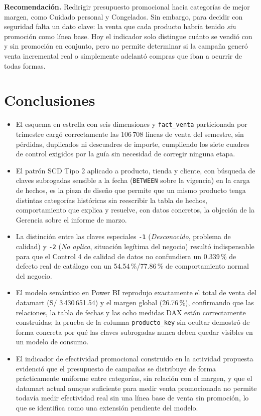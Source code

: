 \documentclass[11pt,a4paper]{article}
\begin{document}
\textbf{Recomendación.} Redirigir presupuesto promocional hacia categorías de mejor margen, como Cuidado personal y Congelados. Sin embargo, para decidir con seguridad falta un dato clave: la venta que cada producto habría tenido \emph{sin} promoción como línea base. Hoy el indicador solo distingue cuánto se vendió con y sin promoción en conjunto, pero no permite determinar si la campaña generó venta incremental real o simplemente adelantó compras que iban a ocurrir de todas formas.

\section{Conclusiones}

\begin{itemize}
  \item El esquema en estrella con seis dimensiones y \texttt{fact\_venta} particionada por trimestre cargó correctamente las 106\,708 líneas de venta del semestre, sin pérdidas, duplicados ni descuadres de importe, cumpliendo los siete cuadres de control exigidos por la guía sin necesidad de corregir ninguna etapa.
  \item El patrón SCD Tipo 2 aplicado a producto, tienda y cliente, con búsqueda de claves subrogadas sensible a la fecha (\texttt{BETWEEN} sobre la vigencia) en la carga de hechos, es la pieza de diseño que permite que un mismo producto tenga distintas categorías históricas sin reescribir la tabla de hechos, comportamiento que explica y resuelve, con datos concretos, la objeción de la Gerencia sobre el informe de marzo.
  \item La distinción entre las claves especiales \texttt{-1} (\emph{Desconocido}, problema de calidad) y \texttt{-2} (\emph{No aplica}, situación legítima del negocio) resultó indispensable para que el Control 4 de calidad de datos no confundiera un 0.339\,\% de defecto real de catálogo con un 54.54\,\%/77.86\,\% de comportamiento normal del negocio.
  \item El modelo semántico en Power BI reprodujo exactamente el total de venta del datamart (S/ 3\,430\,651.54) y el margen global (26.76\,\%), confirmando que las relaciones, la tabla de fechas y las ocho medidas DAX están correctamente construidas; la prueba de la columna \texttt{producto\_key} sin ocultar demostró de forma concreta por qué las claves subrogadas nunca deben quedar visibles en un modelo de consumo.
  \item El indicador de efectividad promocional construido en la actividad propuesta evidenció que el presupuesto de campañas se distribuye de forma prácticamente uniforme entre categorías, sin relación con el margen, y que el datamart actual aunque suficiente para medir venta promocionada no permite todavía medir efectividad real sin una línea base de venta sin promoción, lo que se identifica como una extensión pendiente del modelo.
\end{itemize}
\end{document}
